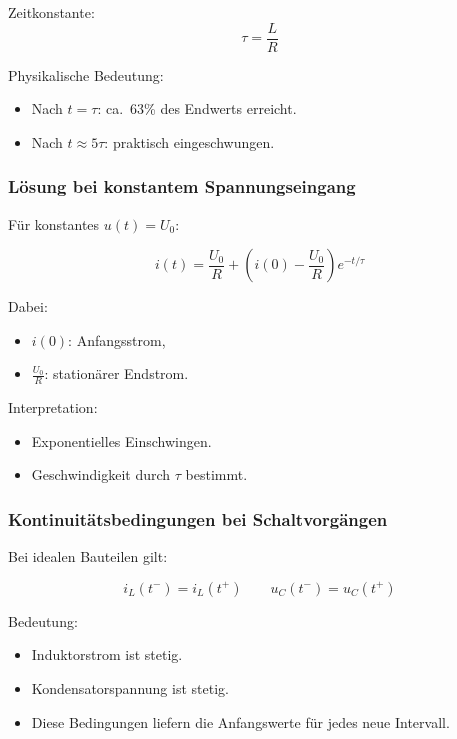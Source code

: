 Zeitkonstante:
\[
\boxed{
\tau = \frac{L}{R}
}
\]

Physikalische Bedeutung:
\begin{itemize}
    \item Nach $t=\tau$: ca.\ 63\% des Endwerts erreicht.
    \item Nach $t \approx 5\tau$: praktisch eingeschwungen.
\end{itemize}


\subsubsection{Lösung bei konstantem Spannungseingang}

Für konstantes $u(t)=U_0$:

\[
\boxed{
i(t) = \frac{U_0}{R} + \left( i(0) - \frac{U_0}{R} \right) e^{-t/\tau}
}
\]

Dabei:
\begin{itemize}
    \item $i(0)$: Anfangsstrom,
    \item $\frac{U_0}{R}$: stationärer Endstrom.
\end{itemize}

Interpretation:
\begin{itemize}
    \item Exponentielles Einschwingen.
    \item Geschwindigkeit durch $\tau$ bestimmt.
\end{itemize}


\subsubsection{Kontinuitätsbedingungen bei Schaltvorgängen}

Bei idealen Bauteilen gilt:

\[
\boxed{i_L(t^-) = i_L(t^+)}
\qquad
\boxed{u_C(t^-) = u_C(t^+)}
\]

Bedeutung:
\begin{itemize}
    \item Induktorstrom ist stetig.
    \item Kondensatorspannung ist stetig.
    \item Diese Bedingungen liefern die Anfangswerte für jedes neue Intervall.
\end{itemize}

